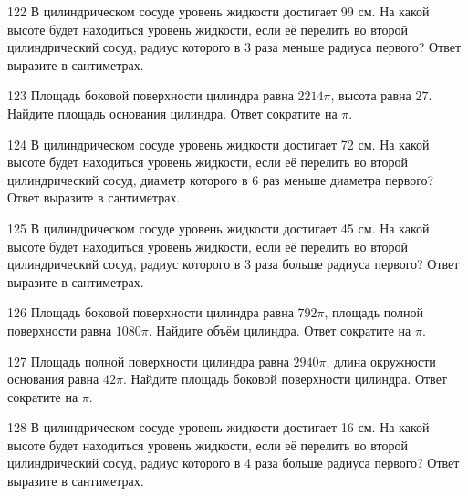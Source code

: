 \documentclass[4apaper]{article}
\begin{document}
\begin{taskBN}{122}
В цилиндрическом сосуде уровень жидкости достигает 99 см. На какой высоте будет находиться уровень жидкости, если её перелить во второй цилиндрический сосуд, радиус которого в 3 раза меньше радиуса первого? Ответ выразите в сантиметрах.
\end{taskBN}

\begin{taskBN}{123}
Площадь боковой поверхности цилиндра равна $2214\pi$, высота равна $27$. Найдите площадь основания цилиндра. Ответ сократите на $\pi$.
\end{taskBN}

\begin{taskBN}{124}
В цилиндрическом сосуде уровень жидкости достигает 72 см. На какой высоте будет находиться уровень жидкости, если её перелить во второй цилиндрический сосуд, диаметр которого в 6 раз меньше диаметра первого? Ответ выразите в сантиметрах.
\end{taskBN}

\begin{taskBN}{125}
В цилиндрическом сосуде уровень жидкости достигает 45 см. На какой высоте будет находиться уровень жидкости, если её перелить во второй цилиндрический сосуд, радиус которого в 3 раза больше радиуса первого? Ответ выразите в сантиметрах.
\end{taskBN}

\begin{taskBN}{126}
Площадь боковой поверхности цилиндра равна $792\pi$, площадь полной поверхности равна $1080\pi$. Найдите объём цилиндра. Ответ сократите на $\pi$.
\end{taskBN}

\begin{taskBN}{127}
Площадь полной поверхности цилиндра равна $2940\pi$, длина окружности основания равна $42\pi$. Найдите площадь боковой поверхности цилиндра. Ответ сократите на $\pi$.
\end{taskBN}

\begin{taskBN}{128}
В цилиндрическом сосуде уровень жидкости достигает 16 см. На какой высоте будет находиться уровень жидкости, если её перелить во второй цилиндрический сосуд, радиус которого в 4 раза больше радиуса первого? Ответ выразите в сантиметрах.
\end{taskBN}
\end{document}
